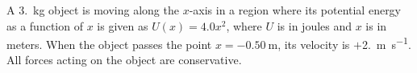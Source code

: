 \documentclass{../../oss-apphys-exam}
\begin{document}
\begin{multicols*}{2}
\begin{questions}
  \newpage
  
%    
%    
  
  \question A \SI{3.}{\kilo\gram} object is moving along the $x$-axis in a
  region where its potential energy as a function of $x$ is given as
  $U(x)=4.0x^2$, where $U$ is in joules and $x$ is in meters. When the object
  passes the point $x=\SI{-0.50}\metre$, its velocity is
  $+$\SI{2.}{\metre\per\second}. All forces acting on the object are
  conservative.
\end{questions}
\end{multicols*}
\end{document}
